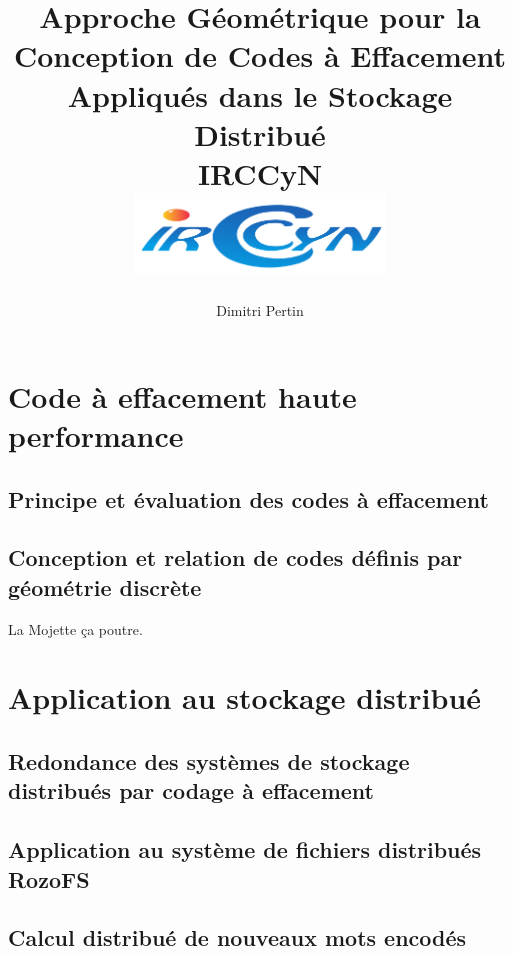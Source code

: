 
\makeindex



\title{
    {Approche Géométrique pour la Conception de Codes à Effacement Appliqués
    dans le Stockage Distribué}\\
    {\large IRCCyN}\\
    {\includegraphics[width=0.5\textwidth]{img/logo_irccyn.pdf}}
}
\author{Dimitri Pertin}
\date {}

\maketitle

\newpage

\tableofcontents

\part{Code à effacement haute performance}

\chapter{Principe et évaluation des codes à effacement}



\chapter{Conception et relation de codes définis par géométrie discrète}

La Mojette ça poutre.



\part{Application au stockage distribué}

\chapter{Redondance des systèmes de stockage distribués par codage à
effacement}



\chapter{Application au système de fichiers distribués RozoFS}



\chapter{Calcul distribué de nouveaux mots encodés}



\newpage

\printbibliography[
]

\printindex


